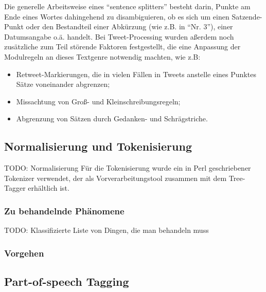 \documentclass[11pt]{article}
\begin{document}
Die generelle Arbeitsweise eines ``sentence splitters'' besteht darin,
Punkte am Ende eines Wortes dahingehend zu disambiguieren, ob es sich
um einen Satzende-Punkt oder den Bestandteil einer Abkürzung (wie
z.B. in ``Nr. 3''), einer Datumsangabe o.ä. handelt. Bei
Tweet-Processing wurden aßerdem noch zusätzliche zum Teil störende
Faktoren festgestellt, die eine Anpassung der Modulregeln an dieses
Textgenre notwendig machten, wie z.B:
\begin{itemize}
  \item Retweet-Markierungen, die in vielen Fällen in Tweets anstelle eines
    Punktes Sätze voneinander abgrenzen;
  \item Missachtung von Groß- und Kleinschreibungsregeln;
  \item Abgrenzung von Sätzen durch Gedanken- und Schrägstriche.
\end{itemize}

\subsection{Normalisierung und Tokenisierung}
TODO: Normalisierung \newline
Für die Tokenisierung wurde ein in Perl geschriebener Tokenizer verwendet, der
als Vorverarbeitungstool zusammen mit dem Tree-Tagger erhältlich ist.  

\subsubsection{Zu behandelnde Phänomene}

TODO: Klassifizierte Liste von Dingen, die man behandeln muss

\subsubsection{Vorgehen}


\subsection{Part-of-speech Tagging} 
\end{document}
